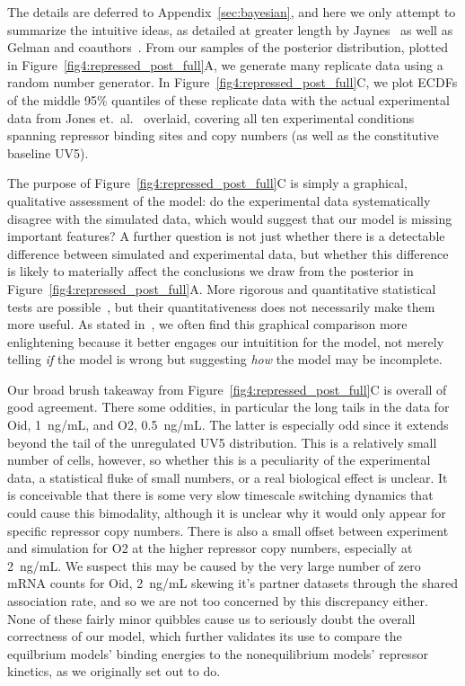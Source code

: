 The details are deferred to Appendix~\ref{sec:bayesian}, and here
we only attempt to summarize the intuitive ideas, as detailed at
greater length by Jaynes~\cite{Jaynes2003} as well as Gelman and
coauthors~\cite{Gelman2013,Gelman2013a}. From our samples of the
posterior distribution, plotted in
Figure~\ref{fig4:repressed_post_full}A, we generate many
replicate data using a random number generator.
In Figure~\ref{fig4:repressed_post_full}C, we plot ECDFs of the
middle 95\% quantiles of these replicate data with the actual
experimental data from Jones et.\ al.~\cite{Jones2014} overlaid,
covering all ten experimental conditions spanning repressor
binding sites and copy numbers (as well as the constitutive
baseline UV5).

The purpose of Figure~\ref{fig4:repressed_post_full}C is simply a
graphical, qualitative assessment of the model: do the
experimental data systematically disagree with the simulated
data, which would suggest that our model is missing important
features? A further question is not just whether there is a
detectable difference between simulated and experimental data,
but whether this difference is likely to materially affect the
conclusions we draw from the posterior in
Figure~\ref{fig4:repressed_post_full}A. More rigorous and
quantitative statistical tests are possible~\cite{Gelman2013},
but their quantitativeness does not necessarily make them more
useful. As stated in~\cite{Gelman2013a}, we often find this
graphical comparison more enlightening because it better engages
our intuitition for the model, not merely telling \textit{if} the
model is wrong but suggesting \textit{how} the model may be
incomplete.

Our broad brush takeaway from
Figure~\ref{fig4:repressed_post_full}C is overall of good
agreement. There some oddities, in particular the long tails in
the data for Oid, 1~ng/mL, and O2, 0.5~ng/mL. The latter is
especially odd since it extends beyond the tail of the
unregulated UV5 distribution. This is a relatively small number
of cells, however, so whether this is a peculiarity of the
experimental data, a statistical fluke of small numbers, or a
real biological effect is unclear. It is conceivable that there
is some very slow timescale switching dynamics that could cause
this bimodality, although it is unclear why it would only appear
for specific repressor copy numbers. There is also a small offset
between experiment and simulation for O2 at the higher repressor
copy numbers, especially at 2~ng/mL. We suspect this may be
caused by the very large number of zero mRNA counts for Oid,
2~ng/mL skewing it's partner datasets through the shared
association rate, and so we are not too concerned by this
discrepancy either. None of these fairly minor quibbles cause us
to seriously doubt the overall correctness of our model, which
further validates its use to compare the equilbrium models'
binding energies to the nonequilibrium models' repressor
kinetics, as we originally set out to do.


